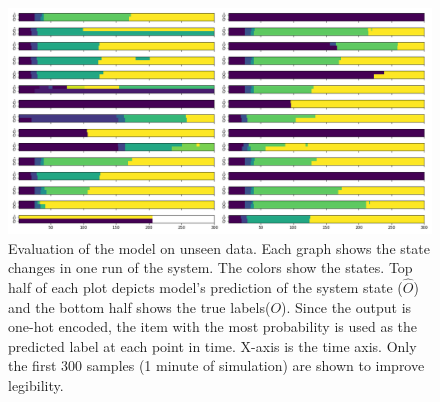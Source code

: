 \begin{figure}[ht]
    \centering
    \includegraphics[width=\linewidth]{Sections/test_0.png}
    \caption{Evaluation of the model on unseen data. Each graph shows the state changes in one run of the system. The colors show the states. Top half of each plot depicts model's prediction of the system state ($\hat{O}$) and the bottom half shows the true labels($O$). Since the output is one-hot encoded, the item with the most probability is used as the predicted label at each point in time. X-axis is the time axis. Only the first 300 samples (1 minute of simulation) are shown to improve legibility.}
    \label{fig:test_0}
\end{figure}

